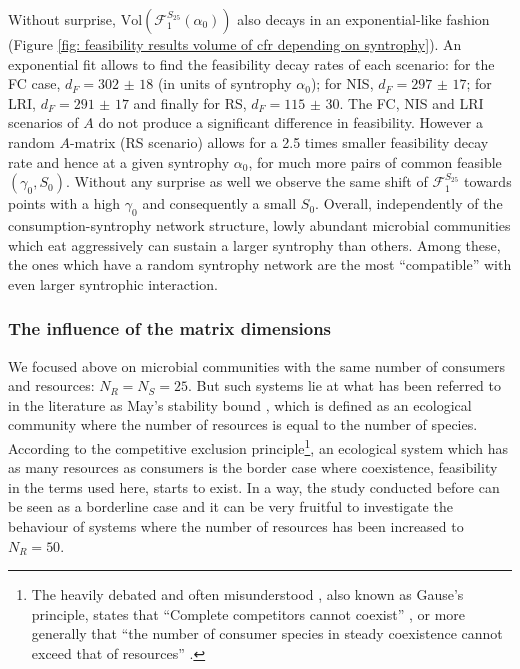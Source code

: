 \documentclass[12pt, titlepage]{report}
\begin{document}
Without surprise, $\text{Vol}\left(\mathcal{F}_1^{S_{25}}(\alpha_0)\right)$ also decays in an exponential-like fashion (Figure \ref{fig: feasibility results volume of cfr depending on syntrophy}). %
An exponential fit allows to find the feasibility decay rates of each scenario: for the FC case, $d_F=\num[scientific-notation=false]{302(18)}$ (in units of syntrophy $\alpha_0$); for NIS, $d_F=\num[scientific-notation=false]{297(17)}$; for LRI, $d_F=\num[scientific-notation=false]{291(17)}$ and finally for RS, $d_F=\num[scientific-notation=false]{115(30)}$. The FC, NIS and LRI scenarios of $A$ do not produce a significant difference in feasibility. However a random $A$-matrix (RS scenario) allows for a 2.5 times smaller feasibility decay rate and hence at a given syntrophy $\alpha_0$, for much more pairs of common feasible $(\gamma_0, S_0)$.
Without any surprise as well we observe the same shift of $\mathcal{F}_1^{S_{25}}$ towards points with a high $\gamma_0$ and consequently a small $S_0$. Overall, independently of the consumption-syntrophy network structure, lowly abundant microbial communities which eat aggressively can sustain a larger syntrophy than others. Among these, the ones which have a random syntrophy network are the most ``compatible'' with even larger syntrophic interaction.



\subsubsection{The influence of the matrix dimensions}
We focused above on microbial communities with the same number of consumers and resources: $N_R=N_S=25$. But such systems lie at what has been referred to in the literature as May's stability bound \cite{biroli_marginally_2018}, which is defined as an ecological community where the number of resources is equal to the number of species. According to the competitive exclusion principle\footnote{The heavily debated and often misunderstood \cite{hardin_competitive_1960} , also known as Gause's principle, states that ``Complete competitors cannot coexist'' \cite{hardin_competitive_1960}, or more generally that ``the number of consumer species in steady coexistence cannot exceed that of resources'' \cite{wang_overcome_2019}.}, an ecological system which has as many resources as consumers is the border case where coexistence, \ie feasibility in the terms used here, starts to exist. In a way, the study conducted before can be seen as a borderline case and it can be very fruitful to investigate the behaviour of systems where the number of resources has been increased to $N_R=50$.
\end{document}
